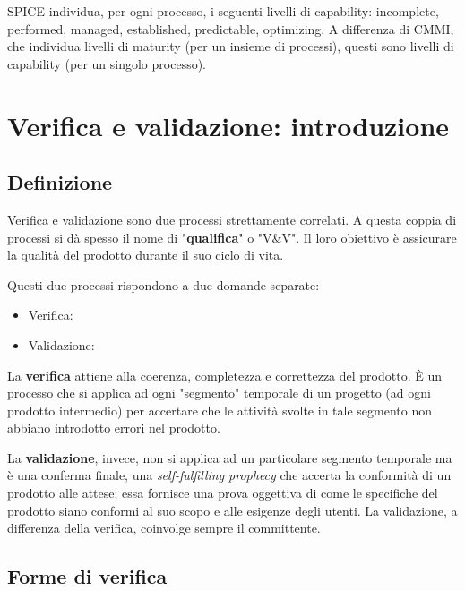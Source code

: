 \documentclass[a4paper]{article}
\begin{document}
		
SPICE individua, per ogni processo, i seguenti livelli di capability: incomplete, performed, managed, established, predictable, optimizing. A differenza di CMMI, che individua livelli di maturity (per un insieme di processi), questi sono livelli di capability (per un singolo processo).
	


		
	\section{Verifica e validazione: introduzione}


		
	\subsection{Definizione}

		
Verifica e validazione sono due processi strettamente correlati. A questa coppia di processi si dà spesso il nome di "\textbf{qualifica}" o "V\&{}V". Il loro obiettivo è assicurare la qualità del prodotto durante il suo ciclo di vita.
		
Questi due processi rispondono a due domande separate:
		
	\begin{itemize}
		
			
	\item Verifica: 
			
	\item Validazione: 
		
	\end{itemize}

		
La \textbf{verifica} attiene alla coerenza, completezza e correttezza del prodotto. È un processo che si applica ad ogni "segmento" temporale di un progetto (ad ogni prodotto intermedio) per accertare che le attività svolte in tale segmento non abbiano introdotto errori nel prodotto.
		
La \textbf{validazione}, invece, non si applica ad un particolare segmento temporale ma è una conferma finale, una \emph{self-fulfilling prophecy} che accerta la conformità di un prodotto alle attese; essa fornisce una prova oggettiva di come le specifiche del prodotto siano conformi al suo scopo e alle esigenze degli utenti. La validazione, a differenza della verifica, coinvolge sempre il committente.

		
	\subsection{Forme di verifica}
\end{document}
